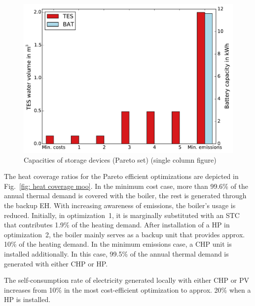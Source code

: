 \begin{figure}[h!]
	\begin{center}
		\includegraphics[width=\linewidth]{figures/plot_cap_sto_moo.pdf}
		\caption{Capacities of storage devices (Pareto set) (single column figure)}
		\label{fig: cap storage moo}
	\end{center}
\end{figure}

The heat coverage ratios for the Pareto efficient optimizations are depicted in Fig.~\ref{fig: heat coverage moo}.
In the minimum cost case, more than 99.6\% of the annual thermal demand is covered with the boiler, the rest is generated through the backup EH.
With increasing awareness of emissions, the boiler's usage is reduced.
Initially, in optimization~1, it is marginally substituted with an STC that contributes 1.9\% of the heating demand.
After installation of a HP in optimization~2, the boiler mainly serves as a backup unit that provides approx. 10\% of the heating demand.
In the minimum emissions case, a CHP unit is installed additionally.
In this case, 99.5\% of the annual thermal demand is generated with either CHP or HP.

The self-consumption rate of electricity generated locally with either CHP or PV increases from 10\% in the most cost-efficient optimization to approx. 20\% when a HP is installed. 

